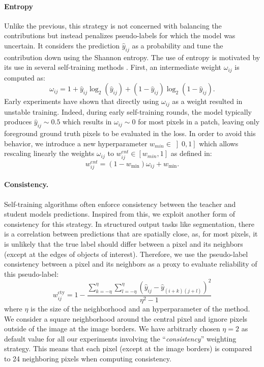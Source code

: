 \paragraph{Entropy} \label{par:strain:entropyweight} Unlike the previous, this strategy is not concerned with balancing the contributions but instead penalizes pseudo-labels for which the model was uncertain. It considers the prediction $\hat{y}_{ij}$ as a probability and tune the contribution down using the Shannon entropy. The use of entropy is motivated by its use in several self-training methods \cite{grandvalet2004semi,lee2013pseudo}. First, an intermediate weight $\omega_{ij}$ is computed as: 
\begin{equation}
\omega_{ij} = 1 + \hat{y}_{ij} \log_2(\hat{y}_{ij}) + (1 - \hat{y}_{ij}) \log_2(1 - \hat{y}_{ij}).
\label{eqn:strain:entropyweight}
\end{equation}
Early experiments have shown that directly using $\omega_{ij}$ as a weight resulted in unstable training. Indeed, during early self-training rounds, the model typically produces $\hat{y}_{ij} \sim 0.5$ which results in $\omega_{ij} \sim 0$ for most pixels in a patch, leaving only foreground ground truth pixels to be evaluated in the loss. In order to avoid this behavior, we introduce a new hyperparameter $w_{min} \in \left]0, 1\right]$ which allows rescaling linearly the weights $\omega_{ij}$ to $w^{ent}_{ij} \in [w_{min},1]$ as defined in:
\begin{equation}
w^{ent}_{ij} = \left(1 - w_{\text{min}}\right) \omega_{ij} + w_{\text{min}}.
\label{eqn:strain:wminrescale}
\end{equation}

\paragraph{Consistency.} Self-training algorithms often enforce consistency between the teacher and student models predictions. Inspired from this, we exploit another form of consistency for this strategy. In structured output tasks like segmentation, there is a correlation between predictions that are spatially close, as, for most pixels, it is unlikely that the true label should differ between a pixel and its neighbors (except at the edges of objects of interest). Therefore, we use the pseudo-label consistency between a pixel and its neighbors as a proxy to evaluate reliability of this pseudo-label: %
\begin{equation}
w^{\text{cty}}_{ij} = 1 - \dfrac{\sum_{k=-\eta}^{\eta} \sum_{l=-\eta}^{\eta} (\hat{y}_{ij}- \hat{y}_{(i+k)(j+l)})^2}{\eta^2 - 1}
\end{equation}
where $\eta$ is the size of the neighborhood and an hyperparameter of the method. We consider a square neighborhood around the central pixel and ignore pixels outside of the image at the image borders. We have arbitrarly chosen $\eta = 2$ as default value for all our experiments involving the ``\textit{consistency}'' weighting strategy. This means that each pixel (except at the image borders) is compared to 24 neighboring pixels when computing consistency. 

